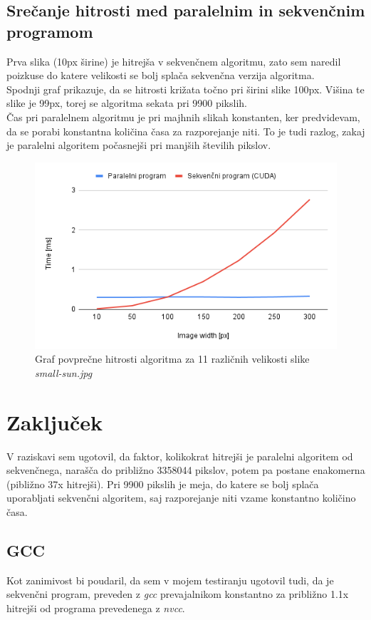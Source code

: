 \documentclass{article}
\begin{document}
\subsection{Srečanje hitrosti med paralelnim in sekvenčnim programom}
Prva slika (10px širine) je hitrejša v sekvenčnem algoritmu, zato sem naredil poizkuse do katere velikosti se bolj splača sekvenčna verzija algoritma.\\
Spodnji graf prikazuje, da se hitrosti križata točno pri širini slike 100px. Višina te slike je 99px, torej se algoritma sekata pri 9900 pikslih.\\
Čas pri paralelnem algoritmu je pri majhnih slikah konstanten, ker predvidevam, da se porabi konstantna količina časa za razporejanje niti. To je tudi razlog, zakaj je paralelni algoritem počasnejši pri manjših številih pikslov.
\begin{figure}[!h]
    \centering
    \includegraphics[width=1\linewidth]{images/small-chart.png}
    \caption{Graf povprečne hitrosti algoritma za 11 različnih velikosti slike \textit{small-sun.jpg}}
\end{figure}
\clearpage
\section{Zaključek}
V raziskavi sem ugotovil, da faktor, kolikokrat hitrejši je paralelni algoritem od sekvenčnega, narašča do približno 3358044 pikslov, potem pa postane enakomerna (pibližno 37x hitrejši). Pri 9900 pikslih je meja, do katere se bolj splača uporabljati sekvenčni algoritem, saj razporejanje niti vzame konstantno količino časa.\\
\subsection{GCC}
Kot zanimivost bi poudaril, da sem v mojem testiranju ugotovil tudi, da je sekvenčni program, preveden z \textit{gcc} prevajalnikom konstantno za približno 1.1x hitrejši od programa prevedenega z \textit{nvcc}.
\end{document}
